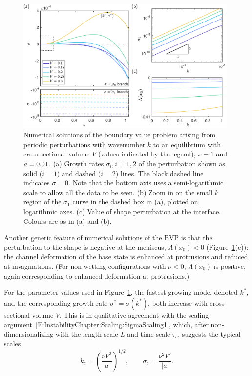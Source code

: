 \begin{figure}[t]
\centering
\includegraphics[width = 0.98\textwidth]{Growth_rates}
\caption{Numerical solutions of the boundary value problem arising from periodic perturbations with wavenumber $k$ to an equilibrium with cross-sectional volume $V$ (values indicated by the legend), $\nu = 1$ and $a = 0.01$. (a) Growth rates $\sigma_{i}, i = 1,2$ of the perturbation shown as solid ($i = 1$) and dashed ($i = 2$) lines. The black dashed line indicates $\sigma = 0$. Note that the bottom axis uses a semi-logarithmic scale to allow all the data to be seen. (b) Zoom in on the small $k$ region of the $\sigma_1$ curve in the dashed box in (a), plotted on logarithmic axes. (c) Value of shape perturbation at the interface. Colours are as in (a) and (b).}
\label{fig:InstabilityChapter:SlowCondensation:GrowthRates}
\end{figure}


Another generic feature of numerical solutions of the BVP is that the perturbation to the shape is negative at the meniscus, $\Lambda(x_0) <0$  (Figure~\ref{fig:InstabilityChapter:SlowCondensation:GrowthRates}(c)): the channel deformation of the base state is enhanced at protrusions and reduced at invaginations. (For non-wetting configurations with $\nu <0$, $\Lambda(x_0)$ is positive, again corresponding to enhanced deformation at protrusions.)

For the parameter values used in Figure~\ref{fig:InstabilityChapter:SlowCondensation:GrowthRates}, the fastest growing mode, denoted $k^*$, and the corresponding growth rate $\sigma^* = \sigma(k^*)$, both increase with cross-sectional volume $V$. This is in qualitative agreement with the scaling argument~\eqref{E:InstabilityChapter:Scaling:SigmaScaling1}, which, after non-dimensionalizing with the length scale $L$ and time scale $\tau_c$, suggests the typical scales
\begin{equation}\label{E:InstabilityChapter:SlowCondensation:NumericalSols:DimensionlessScalings}
k_c  = \left(\frac{\nu V^3}{a}\right)^{1/2}, \qquad \sigma_c = \frac{\nu^2 V^7}{|a|}.
\end{equation}

